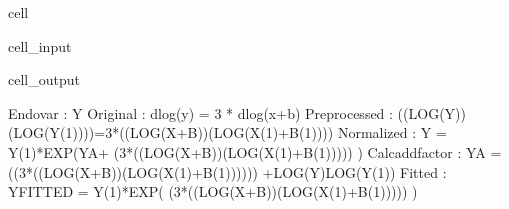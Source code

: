 \documentclass[letterpaper,10pt,english]{jupyterBook}
\begin{document}
\begin{sphinxuseclass}{cell}\begin{sphinxVerbatimInput}

\begin{sphinxuseclass}{cell_input}
\begin{sphinxVerbatim}[commandchars=\\\{\}]
\end{sphinxVerbatim}

\end{sphinxuseclass}\end{sphinxVerbatimInput}
\begin{sphinxVerbatimOutput}

\begin{sphinxuseclass}{cell_output}
\begin{sphinxVerbatim}[commandchars=\\\{\}]
Endo\PYGZus{}var        : Y
Original        : dlog(y)  = 3 * dlog(x+b) 
Preprocessed    : ((LOG(Y))\PYGZhy{}(LOG(Y(\PYGZhy{}1))))=3*((LOG(X+B))\PYGZhy{}(LOG(X(\PYGZhy{}1)+B(\PYGZhy{}1))))
Normalized      : Y = Y(\PYGZhy{}1)*EXP(Y\PYGZus{}A+ (3*((LOG(X+B))\PYGZhy{}(LOG(X(\PYGZhy{}1)+B(\PYGZhy{}1))))) )
Calc\PYGZus{}add\PYGZus{}factor : Y\PYGZus{}A = \PYGZhy{} ((3*((LOG(X+B))\PYGZhy{}(LOG(X(\PYGZhy{}1)+B(\PYGZhy{}1)))))) +LOG(Y)\PYGZhy{}LOG(Y(\PYGZhy{}1))
Fitted          : Y\PYGZus{}FITTED = Y(\PYGZhy{}1)*EXP( (3*((LOG(X+B))\PYGZhy{}(LOG(X(\PYGZhy{}1)+B(\PYGZhy{}1))))) )
\end{sphinxVerbatim}

\begin{sphinxVerbatim}[commandchars=\\\{\}]

\end{sphinxVerbatim}

\end{sphinxuseclass}\end{sphinxVerbatimOutput}

\end{sphinxuseclass}
\end{document}
